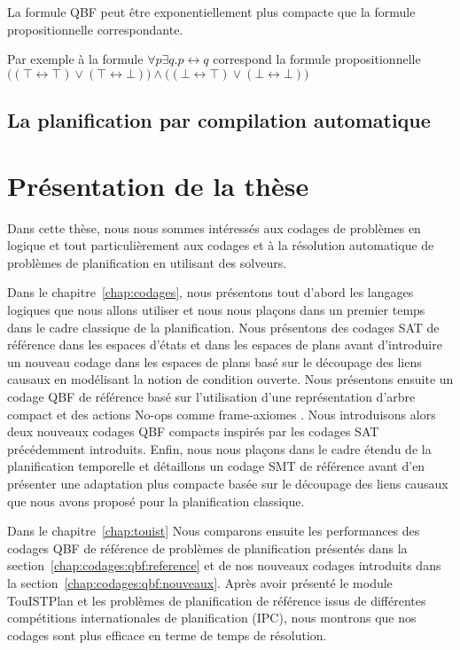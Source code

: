 La formule QBF peut être exponentiellement plus compacte que la formule propositionnelle correspondante. 

Par exemple à la formule $\forall p \exists q.p \leftrightarrow q$ correspond la formule propositionnelle \\
$\Big ( (\top \leftrightarrow \top)\vee (\top \leftrightarrow \bot) \Big ) \wedge \Big ( (\bot \leftrightarrow \top)\vee (\bot \leftrightarrow \bot) \Big )$

\subsection{La planification par compilation automatique}


\section{Présentation de la thèse}

Dans cette thèse, nous nous sommes intéressés aux codages de problèmes en logique et tout particulièrement aux codages et à la résolution automatique de problèmes de planification en utilisant des solveurs.

Dans le chapitre~\ref{chap:codages}, nous présentons tout d'abord les langages logiques que nous allons utiliser et 
nous nous plaçons dans un premier temps dans le cadre classique de la planification. Nous présentons des codages SAT de référence dans les espaces d'états \cite{KS92,KS95} et dans les espaces de plans \cite{MK99} avant d'introduire un nouveau codage dans les espaces de plans basé sur le découpage des liens causaux en modélisant la notion de condition ouverte. Nous présentons ensuite un codage QBF de référence basé sur l'utilisation d'une représentation d'arbre compact et des actions No-ops comme frame-axiomes \cite{DBLP:conf/ecai/CashmoreFG12,DBLP:phd/ethos/Cashmore13}. Nous introduisons alors deux nouveaux codages QBF compacts inspirés par les codages SAT précédemment introduits. Enfin, nous nous plaçons dans le cadre étendu de la planification temporelle et détaillons un codage SMT de référence \cite{MarisRegnier08} avant d'en présenter une adaptation plus compacte basée sur le découpage des liens causaux que nous avons proposé pour la planification classique.

Dans le chapitre~\ref{chap:touist} 
Nous comparons ensuite les performances des codages QBF de référence de problèmes de planification présentés dans la section~\ref{chap:codages:qbf:reference} et de nos nouveaux codages introduits dans la section~\ref{chap:codages:qbf:nouveaux}. Après avoir présenté le module TouISTPlan et les problèmes de planification de référence issus de différentes compétitions internationales de planification (IPC), nous montrons que nos codages sont plus efficace en terme de temps de résolution.